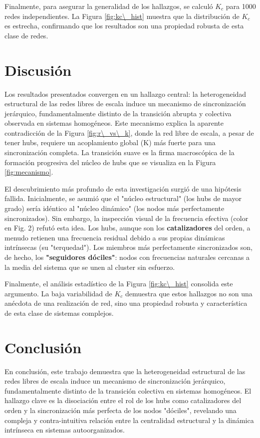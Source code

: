 \documentclass[12pt, a4paper]{article}
\begin{document}
Finalmente, para asegurar la generalidad de los hallazgos, se calculó \(K_c\) para 1000 redes independientes. La Figura \ref{fig:kc\_hist} muestra que la distribución de \(K_c\) es estrecha, confirmando que los resultados son una propiedad robusta de esta clase de redes.

\section{Discusión}

Los resultados presentados convergen en un hallazgo central: la heterogeneidad estructural de las redes libres de escala induce un mecanismo de sincronización jerárquico, fundamentalmente distinto de la transición abrupta y colectiva observada en sistemas homogéneos. Este mecanismo explica la aparente contradicción de la Figura \ref{fig:r\_vs\_k}, donde la red libre de escala, a pesar de tener hubs, requiere un acoplamiento global (K) más fuerte para una sincronización completa. La transición suave es la firma macroscópica de la formación progresiva del núcleo de hubs que se visualiza en la Figura \ref{fig:mecanismo}.

El descubrimiento más profundo de esta investigación surgió de una hipótesis fallida. Inicialmente, se asumió que el "núcleo estructural" (los hubs de mayor grado) sería idéntico al "núcleo dinámico" (los nodos más perfectamente sincronizados). Sin embargo, la inspección visual de la frecuencia efectiva (color en Fig. 2) refutó esta idea. Los hubs, aunque son los \textbf{catalizadores} del orden, a menudo retienen una frecuencia residual debido a sus propias dinámicas intrínsecas (su "terquedad"). Los miembros más perfectamente sincronizados son, de hecho, los \textbf{"seguidores dóciles"}: nodos con frecuencias naturales cercanas a la media del sistema que se unen al cluster sin esfuerzo.

Finalmente, el análisis estadístico de la Figura \ref{fig:kc\_hist} consolida este argumento. La baja variabilidad de \(K_c\) demuestra que estos hallazgos no son una anécdota de una realización de red, sino una propiedad robusta y característica de esta clase de sistemas complejos.

\section{Conclusión}

En conclusión, este trabajo demuestra que la heterogeneidad estructural de las redes libres de escala induce un mecanismo de sincronización jerárquico, fundamentalmente distinto de la transición colectiva en sistemas homogéneos. El hallazgo clave es la disociación entre el rol de los hubs como catalizadores del orden y la sincronización más perfecta de los nodos "dóciles", revelando una compleja y contra-intuitiva relación entre la centralidad estructural y la dinámica intrínseca en sistemas autoorganizados.
\end{document}

